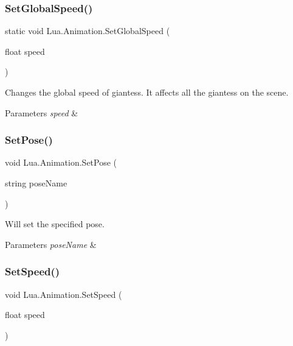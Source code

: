 \subsubsection{\texorpdfstring{SetGlobalSpeed()}{SetGlobalSpeed()}}
{\footnotesize\ttfamily static void Lua.\+Animation.\+Set\+Global\+Speed (\begin{DoxyParamCaption}\item[{float}]{speed }\end{DoxyParamCaption})\hspace{0.3cm}{\ttfamily [static]}}



Changes the global speed of giantess. It affects all the giantess on the scene. 


\begin{DoxyParams}{Parameters}
{\em speed} & \\
\hline
\end{DoxyParams}
\mbox{\label{class_lua_1_1_animation_ad3fe96a39d87c9f3b1121fbbd05f61ea}} 
\subsubsection{\texorpdfstring{SetPose()}{SetPose()}}
{\footnotesize\ttfamily void Lua.\+Animation.\+Set\+Pose (\begin{DoxyParamCaption}\item[{string}]{pose\+Name }\end{DoxyParamCaption})}



Will set the specified pose. 


\begin{DoxyParams}{Parameters}
{\em pose\+Name} & \\
\hline
\end{DoxyParams}
\mbox{\label{class_lua_1_1_animation_aefdc9f4c78bada7dacfdb39d07c4b576}} 
\subsubsection{\texorpdfstring{SetSpeed()}{SetSpeed()}}
{\footnotesize\ttfamily void Lua.\+Animation.\+Set\+Speed (\begin{DoxyParamCaption}\item[{float}]{speed }\end{DoxyParamCaption})}



